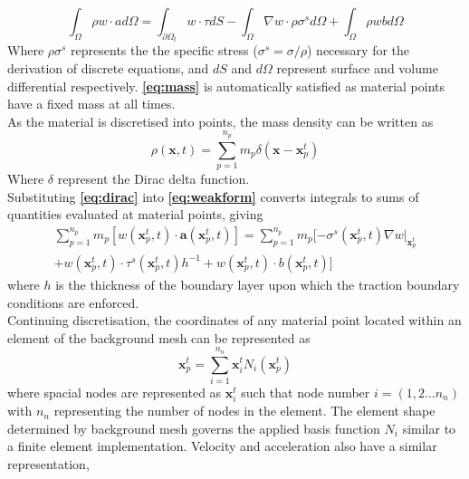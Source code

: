 \begin{equation}
\int_\Omega \rho w \cdot ad\Omega =  \int_{\partial\Omega_t} w\cdot\tau dS - \int_\Omega \nabla w\cdot\rho\sigma^s d\Omega + \int_\Omega \rho w b d\Omega
\label{eq:weakform}
\end{equation}
Where $\rho\sigma^s$ represents the the specific stress ($\sigma^s = \sigma / \rho$) necessary for the derivation of discrete equations, and $dS$ and $d\Omega$ represent surface and volume differential respectively. {\bfseries \ref{eq:mass}} is automatically satisfied as material points have a fixed mass at all times.\\
\newline
\noindent
As the material is discretised into points, the mass density can be written as
\begin{equation}
\rho(\mathbf{x},t) = \sum_{p=1}^{n_p} m_p \delta(\mathbf{x-x}_p^t)
\label{eq:dirac}
\end{equation}
Where $\delta$ represent the Dirac delta function.\\
\newline
\noindent
Substituting {\bfseries \ref{eq:dirac}} into {\bfseries \ref{eq:weakform}} converts integrals to sums of quantities evaluated at material points, giving
\begin{equation}
\begin{aligned}
\sum_{p=1}^{n_p} m_p [w(\mathbf{x}_p^t,t)\cdot \mathbf{a}(\mathbf{x}_p^t,t)] = \sum_{p=1}^{n_p} m_p [-\sigma^s (\mathbf{x}_p^t,t)\nabla w \rvert_{\mathbf{x}_p^t}\\  + w(\mathbf{x}_p^t,t) \cdot \tau^s(\mathbf{x}_p^t,t)h^{-1} + w(\mathbf{x}_p^t,t) \cdot b(\mathbf{x}_p^t,t)]
\label{eq:sum1}
\end{aligned}
\end{equation}
where $h$ is the thickness of the boundary layer upon which the traction boundary conditions are enforced.\\
\newline
\noindent
Continuing discretisation, the coordinates of any material point located within an element of the background mesh can be represented as
\begin{equation}
\mathbf{x}_p^t = \sum_{i=1}^{n_n} \mathbf{x}_i^t N_i(\mathbf{x}_p^t)
\label{eq:shapefunction}
\end{equation}
where spacial nodes are represented as $\mathbf{x}_i^t$ such that node number $i = (1,2...n_n)$ with $n_n$ representing the number of nodes in the element. The element shape determined by background mesh governs the applied basis function $N_i$ similar to a finite element implementation. Velocity and acceleration also have a similar representation,
